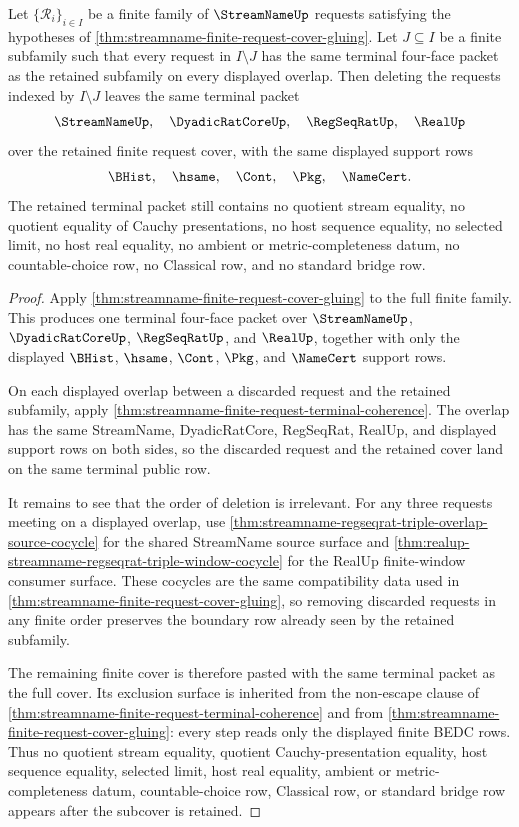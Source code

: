 \begin{theorem}
\label{thm:streamname-finite-request-subcover-terminal-invariance}
Let $\{\mathcal{R}_i\}_{i\in I}$ be a finite family of $\StreamNameUp$
requests satisfying the hypotheses of
\autoref{thm:streamname-finite-request-cover-gluing}. Let $J\subseteq I$ be a
finite subfamily such that every request in $I\setminus J$ has the same
terminal four-face packet as the retained subfamily on every displayed
overlap. Then deleting the requests indexed by $I\setminus J$ leaves the same
terminal packet
$$
\StreamNameUp,\quad \DyadicRatCoreUp,\quad \RegSeqRatUp,\quad \RealUp
$$
over the retained finite request cover, with the same displayed support rows
$$
\BHist,\quad \hsame,\quad \Cont,\quad \Pkg,\quad \NameCert.
$$
The retained terminal packet still contains no quotient stream equality, no
quotient equality of Cauchy presentations, no host sequence equality, no
selected limit, no host real equality, no ambient or metric-completeness
datum, no countable-choice row, no Classical row, and no standard bridge row.
\end{theorem}
\begin{proof}
Apply \autoref{thm:streamname-finite-request-cover-gluing} to the full finite
family. This produces one terminal four-face packet over $\StreamNameUp$,
$\DyadicRatCoreUp$, $\RegSeqRatUp$, and $\RealUp$, together with only the
displayed $\BHist$, $\hsame$, $\Cont$, $\Pkg$, and $\NameCert$ support rows.

On each displayed overlap between a discarded request and the retained
subfamily, apply
\autoref{thm:streamname-finite-request-terminal-coherence}. The overlap has
the same StreamName, DyadicRatCore, RegSeqRat, RealUp, and displayed support
rows on both sides, so the discarded request and the retained cover land on
the same terminal public row.

It remains to see that the order of deletion is irrelevant. For any three
requests meeting on a displayed overlap, use
\autoref{thm:streamname-regseqrat-triple-overlap-source-cocycle} for the
shared StreamName source surface and
\autoref{thm:realup-streamname-regseqrat-triple-window-cocycle} for the RealUp
finite-window consumer surface. These cocycles are the same compatibility
data used in \autoref{thm:streamname-finite-request-cover-gluing}, so removing
discarded requests in any finite order preserves the boundary row already
seen by the retained subfamily.

The remaining finite cover is therefore pasted with the same terminal packet
as the full cover. Its exclusion surface is inherited from the non-escape
clause of \autoref{thm:streamname-finite-request-terminal-coherence} and from
\autoref{thm:streamname-finite-request-cover-gluing}: every step reads only
the displayed finite BEDC rows. Thus no quotient stream equality, quotient
Cauchy-presentation equality, host sequence equality, selected limit, host
real equality, ambient or metric-completeness datum, countable-choice row,
Classical row, or standard bridge row appears after the subcover is retained.
\end{proof}

